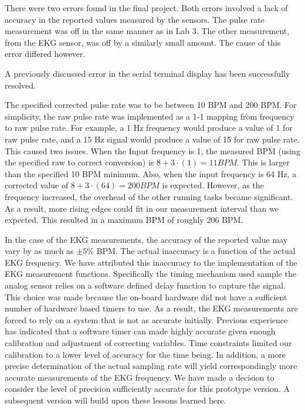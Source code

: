 \documentclass[12pt]{article} %
\begin{document}
		There were two errors found in the final project. Both errors involved a
		lack of accuracy in the reported values measured by the sensors. The pulse
		rate measurement was off in the same manner as in Lab 3. The other
		measurement, from the EKG sensor, was off by a similarly small amount. The
		cause of this error differed however.

		A previously discussed error in the serial terminal display has been
		successfully resolved.

    The specified corrected pulse rate was to be between 10 BPM and 200 BPM.
    For simplicity, the raw pulse rate was implemented as a 1-1 mapping from
    frequency to raw pulse rate.  For example, a 1 Hz frequency would produce a
    value of 1 for raw pulse rate, and a 15 Hz signal would produce a value of
    15 for raw pulse rate.  This caused two issues.  When the Input frequency
    is 1, the measured BPM (using the specified raw to correct conversion) is
    $8 + 3\cdot(1) = 11 BPM$.  This is larger than the specified 10 BPM
    minimum.  Also, when the input frequency is 64 Hz, a corrected value of 
    $8 + 3\cdot(64) = 200 BPM$ is expected.  However, as the frequency
    increased, the overhead of the other running tasks became significant.
    As a result, more rising edges could fit in our measurement interval
    than we expected.  This resulted in a maximum BPM of roughly 206 BPM.

		In the case of the EKG measurements, the accuracy of the reported value may
		vary by as much as $  \pm 5\%$ BPM. The actual inaccuracy is a function of the
		actual EKG frequency. We have attributed this inaccuracy to the
		implementation of the EKG measurement functions. Specifically the timing
		mechanism used sample the analog sensor relies on a software defined delay
		function to capture the signal. This choice was made because the on-board
		hardware did not have a sufficient number of hardware based timers to use.
		As a result, the EKG measurements are forced to rely on a system that is
		not as accurate initially. Previous experience has indicated that a
		software timer can made highly accurate given enough calibration and
		adjustment of correcting variables. Time constraints limited our
		calibration to a lower level of accuracy for the time being. In addition, a
		more precise determination of the actual sampling rate will yield
		correspondingly more accurate measurements of the EKG frequency. We have
		made a decision to consider the level of precision sufficiently accurate
		for this prototype version. A subsequent version will build upon these
		lessons learned here.
\end{document}
